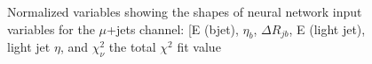 \begin{figure}[h!]
\vspace{-4.5mm}
\hfil
{}
\caption{Normalized variables showing the shapes of neural network input variables for the $\mu$+jets channel: [E (bjet), $\eta_b$, $\Delta R_{jb}$, E (light jet), light jet $\eta$, and $\chi^2_\nu$ the total $\chi^2$ fit value  }
\label{fig:VarPlots4}
\end{figure}


